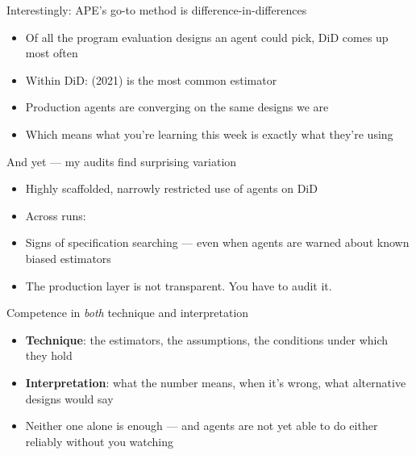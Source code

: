 \documentclass[aspectratio=169,11pt]{beamer}
\begin{document}
\begin{frame}{Interestingly: APE's go-to method is difference-in-differences}
\vspace{0.5em}
\begin{itemize}
  \item Of all the program evaluation designs an agent could pick, DiD comes up most often
  \item Within DiD:  (2021) is the most common estimator
  \item Production agents are converging on the same designs we are
  \item Which means what you're learning this week is exactly what they're using
\end{itemize}
\end{frame}

\begin{frame}{And yet --- my audits find surprising variation}
\vspace{0.5em}
\begin{itemize}
  \item Highly scaffolded, narrowly restricted use of agents on DiD
  \item Across runs: 
  \item Signs of specification searching --- even when agents are warned about known biased estimators
  \item The production layer is not transparent. You have to audit it.
\end{itemize}
\end{frame}

\begin{frame}{Competence in \textit{both} technique and interpretation}
\vspace{0.5em}
\begin{itemize}
  \item \textbf{Technique}: the estimators, the assumptions, the conditions under which they hold
  \item \textbf{Interpretation}: what the number means, when it's wrong, what alternative designs would say
  \item Neither one alone is enough --- and agents are not yet able to do either reliably without you watching
\end{itemize}
\end{frame}
\end{document}
